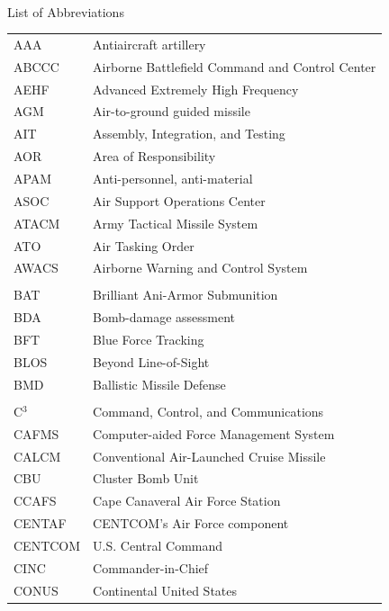 

\renewcommand{\baselinestretch}{1}
\small\normalsize
\hbox{\ }

\vspace{-.6in}

\begin{center}
\large{List of Abbreviations}
\end{center}

\vspace{1em}

\begin{supertabular}{ll}
AAA & Antiaircraft artillery \\
ABCCC & Airborne Battlefield Command and Control Center \\
AEHF & Advanced Extremely High Frequency \\
AGM & Air-to-ground guided missile \\
AIT & Assembly, Integration, and Testing \\
AOR & Area of Responsibility \\
APAM & Anti-personnel, anti-material \\
ASOC & Air Support Operations Center \\
ATACM & Army Tactical Missile System \\
ATO & Air Tasking Order \\
AWACS & Airborne Warning and Control System \\
\\
BAT & Brilliant Ani-Armor Submunition \\
BDA & Bomb-damage assessment  \\
BFT & Blue Force Tracking \\
BLOS & Beyond Line-of-Sight \\
BMD & Ballistic Missile Defense \\
\\
C$^{3}$ & Command, Control, and Communications \\
CAFMS & Computer-aided Force Management System \\
CALCM & Conventional Air-Launched Cruise Missile \\
CBU & Cluster Bomb Unit \\
CCAFS & Cape Canaveral Air Force Station \\
CENTAF & CENTCOM's Air Force component \\
CENTCOM & U.S. Central Command \\
CINC & Commander-in-Chief \\
CONUS & Continental United States \\

\end{supertabular}
